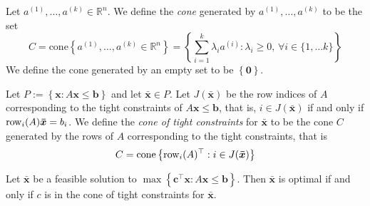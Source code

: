 \begin{defbox}
    \begin{definition}
        Let $ a^{(1)},\ldots ,a^{(k)} \in \mathbb{R}^n $.
        We define the \emph{cone} generated by $ a^{(1)},\ldots ,a^{(k)} $ to
        be the set
        \[ C=\text{cone}
            \left\{ a^{(1)},\ldots ,a^{(k)}\in\mathbb{R}^n \right\}=\left\{ \sum\limits_{i=1}^{k} \lambda_i a^{(i)}:\lambda_i\geqslant  0,\,
            \forall i\in\{1,\ldots k\}\right\} \]
        We define the cone generated by an empty set to be $ \left\{\bm{0}\right\} $.
    \end{definition}
\end{defbox}

\begin{defbox}
    \begin{definition}
        Let $ P:=\left\{ \bm{x}:A \bm{x}\leqslant \bm{b}\right\} $ and let
        $ \bm{\bar{x}}\in P $. Let $ J(\bm{\bar{x}}) $ be the row
        indices of $ A $ corresponding to the tight constraints
        of $ A \bm{x}\leqslant \bm{b} $, that is, $ i\in J(\bm{\bar{x}}) $
        if and only if $ \operatorname{row}_i(A)\bm{\bar{x}}=b_i $.
        We define the \emph{cone of tight constraints} for $ \bm{\bar{x}} $ to
        be the cone $ C $ generated by the rows of $ A $ corresponding to
        the tight constraints, that is
        \[ C=\operatorname{cone}\left\{ \operatorname{row}_i(A)^\top:i\in J(\bm{\bar{x}})\right\} \]
    \end{definition}
\end{defbox}

\begin{thmbox}
    \begin{theorem}
        Let $ \bm{\bar{x}} $ be a feasible solution to $ \max \left\{ \bm{c}^\top
            \bm{x}:A \bm{x}\leqslant \bm{b}\right\} $. Then $ \bm{\bar{x}} $ is
        optimal if and only if $ c $ is in the cone of tight constraints
        for $ \bm{\bar{x}} $.
    \end{theorem}
\end{thmbox}
